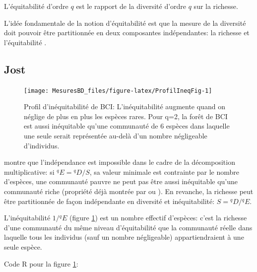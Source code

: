 \documentclass[
  11pt,
  french,
  a4paper,
  extrafontsizes,onecolumn,openright
  ]{memoir}
\begin{document}
L'équitabilité d'ordre \(q\) est le rapport de la diversité d'ordre \(q\) sur la richesse.

L'idée fondamentale de la notion d'équitabilité est que la mesure de la diversité doit pouvoir être partitionnée en deux composantes indépendantes: la richesse et l'équitabilité \autocite{Smith1996}.

\subsection{Jost}\label{jost}



\scriptsize

\begin{figure}

{\centering \texttt{[image: MesuresBD\_files/figure-latex/ProfilIneqFig-1]} 

}

\caption{Profil d'inéquitabilité de BCI: L'inéquitabilité augmente quand on néglige de plus en plus les espèces rares. Pour q=2, la forêt de BCI est aussi inéquitable qu'une communauté de 6 espèces dans laquelle une seule serait représentée au-delà d'un nombre négligeable d'individus.}\label{fig:ProfilIneqFig}
\end{figure}

\normalsize

\textcite{Jost2010} montre que l'indépendance est impossible dans le cadre de la décomposition multiplicative: si \(^{q}\!E={^{q}\!D/{S}}\), sa valeur minimale est contrainte par le nombre d'espèces, une communauté pauvre ne peut pas être aussi inéquitable qu'une communauté riche (propriété déjà montrée par \textcite{Sheldon1969} ou \textcite{Alatalo1981}).
En revanche, la richesse peut être partitionnée de façon indépendante en diversité et inéquitabilité: \(S={^{q}\!D}/{^{q}\!E}\).

L'inéquitabilité \(1/{^{q}\!E}\) (figure \ref{fig:ProfilIneqFig}) est un nombre effectif d'espèces: c'est la richesse d'une communauté du même niveau d'équitabilité que la communauté réelle dans laquelle tous les individus (sauf un nombre négligeable) appartiendraient à une seule espèce.

Code R pour la figure \ref{fig:ProfilIneqFig}:

\scriptsize
\end{document}
